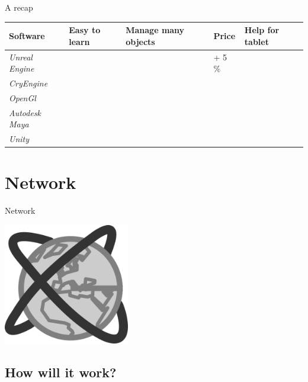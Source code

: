 \documentclass[a4paper,10pt]{beamer}
\begin{document}
			\begin{frame}{A recap}
				\begin{tabular}{|M{50pt}|M{30pt}|M{45pt}|M{80pt}|M{30pt}|}
					\hline
					\textbf{Software} & \textbf{Easy to learn} & \textbf{Manage many objects} & \textbf{Price} & \textbf{Help for tablet}\\
					\hline
					\textit{Unreal Engine} & \color{green}{\checkmark} & \color{green}{\checkmark} & \color{orange}{19\euro/month} + 5 \% & \color{red}{$\times$}\\
					\hline
					\textit{CryEngine} & \color{green}{\checkmark} & \color{green}{\checkmark} & \color{orange}{9.99\euro/month} & \color{orange}{$\sim$}\\
					\hline
					\textit{OpenGl} & \color{red}{$\times$} & \color{orange}{$\sim$} & \color{green}{0\euro} & \color{red}{$\times$}\\
					\hline
					\textit{Autodesk Maya} & \color{red}{$\times$} & \color{green}{\checkmark} & \color{red}{\$185.00/month} & \color{orange}{$\sim$}\\
					\hline
					\textit{Unity} & \color{green}{\checkmark} & \color{green}{\checkmark} & \color{green}{0\euro : free licence} & \color{green}{\checkmark} \\
					\hline
				\end{tabular}
			\end{frame}
			
	\section{Network}
			
			\begin{frame}{Network}
				\centerline{\includegraphics[height=150pt]{images/network/network.png}}
			\end{frame}
			
		\subsection{How will it work?}
		
\end{document}
